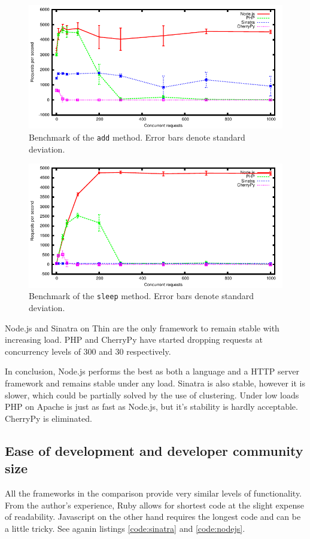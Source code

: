 \documentclass[12pt,oneside]{fithesis}
\begin{document}
		\begin{figure}[h]
	  \centering
	    \includegraphics[width=1.0\textwidth]{plot_add.pdf}
		  \caption{Benchmark of the \texttt{add} method. Error bars denote standard deviation.}
		  \label{fig:bench_add}
		\end{figure}		
		\begin{figure}[h]
	  \centering
	    \includegraphics[width=1.0\textwidth]{plot_sleep.pdf}
		  \caption{Benchmark of the \texttt{sleep} method. Error bars denote standard deviation.}
		  \label{fig:bench_sleep}
		\end{figure}
		
		Node.js and Sinatra on Thin are the only framework to remain stable with increasing load. PHP and CherryPy have started dropping requests at concurrency levels of 300 and 30 respectively.
				
		In conclusion, Node.js performs the best as both a language and a HTTP server framework and remains stable under any load. Sinatra is also stable, however it is slower, which could be partially solved by the use of clustering. Under low loads PHP on Apache is just as fast as Node.js, but it's stability is hardly acceptable. CherryPy is eliminated.
		
	\subsection{Ease of development and developer community size}
		All the frameworks in the comparison provide very similar levels of functionality. From the author's experience, Ruby allows for shortest code at the slight expense of readability. Javascript on the other hand requires the longest code and can be a little tricky. See aganin listings \ref{code:sinatra} and \ref{code:nodejs}.
		
\end{document}
